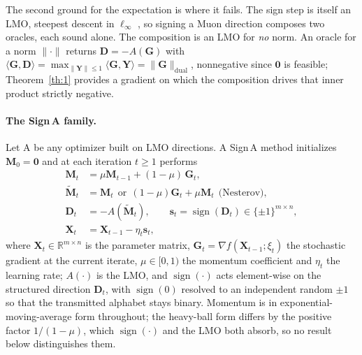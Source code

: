 The second ground for the expectation is where it fails. The sign step is itself an LMO, steepest descent in $\ell_\infty$ \citep{bernstein2024old}, so signing a Muon direction composes two oracles, each sound alone. The composition is an LMO for \emph{no} norm. An oracle for a norm $\|\cdot\|$ returns $\mathbf{D}=-A(\mathbf{G})$ with $\langle\mathbf{G},\mathbf{D}\rangle=\max_{\|\mathbf{Y}\|\le1}\langle\mathbf{G},\mathbf{Y}\rangle=\|\mathbf{G}\|_{\mathrm{dual}}$, nonnegative since $\mathbf{0}$ is feasible; Theorem~\ref{th:1} provides a gradient on which the composition drives that inner product strictly negative.

\paragraph{The Sign\,A family.} Let A be any optimizer built on LMO directions. A Sign\,A method initializes $\mathbf{M}_0 = \mathbf{0}$ and at each iteration $t \ge 1$ performs
\begin{equation}
\label{eq:signa_general}
\begin{aligned}
\mathbf{M}_t &= \mu \mathbf{M}_{t-1} + (1-\mu)\,\mathbf{G}_t,\\
\tilde{\mathbf{M}}_t &= \mathbf{M}_t
   \ \ \text{or}\ \ (1-\mu)\mathbf{G}_t + \mu \mathbf{M}_t\ \ \text{(Nesterov)},\\
\mathbf{D}_t &= -A(\tilde{\mathbf{M}}_t),
   \qquad \mathbf{s}_t = \operatorname{sign}(\mathbf{D}_t) \in \{\pm 1\}^{m \times n},\\
\mathbf{X}_{t} &= \mathbf{X}_{t-1} - \eta_t \mathbf{s}_t,
\end{aligned}
\end{equation}
where $\mathbf{X}_t \in \mathbb{R}^{m \times n}$ is the parameter matrix, $\mathbf{G}_t = \nabla f(\mathbf{X}_{t-1};\xi_t)$ the stochastic gradient at the current iterate, $\mu \in [0, 1)$ the momentum coefficient and $\eta_t$ the learning rate; $A(\cdot)$ is the LMO, and $\operatorname{sign}(\cdot)$ acts element-wise on the structured direction $\mathbf{D}_t$, with $\operatorname{sign}(0)$ resolved to an independent random $\pm1$ so that the transmitted alphabet stays binary. Momentum is in exponential-moving-average form throughout; the heavy-ball form differs by the positive factor $1/(1-\mu)$, which $\operatorname{sign}(\cdot)$ and the LMO both absorb, so no result below distinguishes them.

